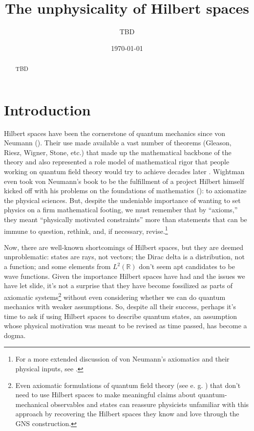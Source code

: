 \documentclass[10pt,twocolumn, nofootinbib]{revtex4-2}
\begin{document}
\title{The unphysicality of Hilbert spaces}
\author{TBD}

\date{\today}


\begin{abstract}
TBD
\end{abstract}

\maketitle

\section{Introduction}

Hilbert spaces have been the cornerstone of quantum mechanics since von Neumann (\cite{von_neumann_mathematische_1996}). Their use made available a vast number of theorems (Gleason, Riesz, Wigner, Stone, etc.) that made up the mathematical backbone of the theory and also represented a role model of mathematical rigor that people working on quantum field theory would try to achieve decades later \cite{haag_discussion_2010}. Wightman even took von Neumann's book to be the fulfillment of a project Hilbert himself kicked off with his problems on the foundations of mathematics (\cite[p. 157]{browder_hilberts_1976}): to axiomatize the physical sciences. But, despite the undeniable importance of wanting to set physics on a firm mathematical footing, we must remember that by ``axioms,'' they meant ``physically motivated constraints'' more than statements that can be immune to question, rethink, and, if necessary, revise.\footnote{For a more extended discussion of von Neumann's axiomatics and their physical inputs, see \cite{redei_soft_2006}.}

Now, there are well-known shortcomings of Hilbert spaces, but they are deemed unproblematic: states are rays, not vectors; the Dirac delta is a distribution, not a function; and some elements from $L^2(\mathbb{R})$ don't seem apt candidates to be wave functions. Given the importance Hilbert spaces have had and the issues we have let slide, it's not a surprise that they have become fossilized as parts of axiomatic systems\footnote{Even axiomatic formulations of quantum field theory (see e. g. \cite{haag_local_1996}) that don't need to use Hilbert spaces to make meaningful claims about quantum-mechanical observables and states can reassure physicists unfamiliar with this approach by recovering the Hilbert spaces they know and love through the GNS construction.} without even considering whether we can do quantum mechanics with weaker assumptions. So, despite all their success, perhaps it's time to ask if using Hilbert spaces to describe quantum states, an assumption whose physical motivation was meant to be revised as time passed, has become a dogma.
\end{document}
